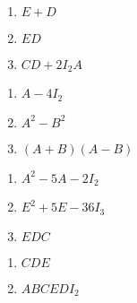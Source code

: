 \documentclass{ximera}
\begin{document}
\begin{multicols}{3} 
\begin{enumerate}
\setcounter{enumi}{\value{HW}}

\item $E + D$
\item $ED$
\item $CD + 2I_{2}A$

\setcounter{HW}{\value{enumi}}
\end{enumerate}
\end{multicols}

\begin{multicols}{3} 
\begin{enumerate}
\setcounter{enumi}{\value{HW}}

\item  $A - 4I_{2}$

\item  $A^2 - B^2$

\item  $(A+B)(A-B)$

\setcounter{HW}{\value{enumi}}
\end{enumerate}
\end{multicols}

\begin{multicols}{3} 
\begin{enumerate}
\setcounter{enumi}{\value{HW}}

\item  $A^2-5A-2I_{2}$

\item  $E^2 + 5E-36I_{3}$

\item $EDC$

\setcounter{HW}{\value{enumi}}
\end{enumerate}
\end{multicols}

\begin{multicols}{3} 
\begin{enumerate}
\setcounter{enumi}{\value{HW}}

\item $CDE$
\item $ABCEDI_{2}$ \label{matarithlast}


\setcounter{HW}{\value{enumi}}
\end{enumerate}
\end{multicols}
\end{document}
